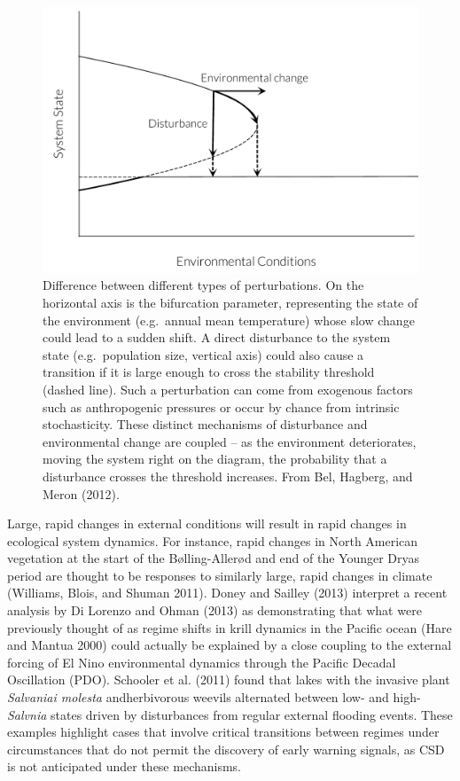 \documentclass[author-year, review]{elsarticle} %
\makeatletter
\def\maxwidth{\ifdim\Gin@nat@width>\linewidth\linewidth
\else\Gin@nat@width\fi}
\let\Oldincludegraphics\includegraphics
\renewcommand{\includegraphics}[1]{\Oldincludegraphics[width=\maxwidth]{#1}}
\makeatother
\begin{document}
\begin{figure}[htbp]
\centering
\includegraphics{Bel2012example.pdf}
\caption{Difference between different types of perturbations. On the
horizontal axis is the bifurcation parameter, representing the state of
the environment (e.g.~annual mean temperature) whose slow change could
lead to a sudden shift. A direct disturbance to the system state
(e.g.~population size, vertical axis) could also cause a transition if
it is large enough to cross the stability threshold (dashed line). Such
a perturbation can come from exogenous factors such as anthropogenic
pressures or occur by chance from intrinsic stochasticity. These
distinct mechanisms of disturbance and environmental change are coupled
-- as the environment deteriorates, moving the system right on the
diagram, the probability that a disturbance crosses the threshold
increases. From Bel, Hagberg, and Meron (2012).}
\end{figure}

Large, rapid changes in external conditions will result in rapid changes
in ecological system dynamics. For instance, rapid changes in North
American vegetation at the start of the Bølling-Allerød and end of the
Younger Dryas period are thought to be responses to similarly large,
rapid changes in climate (Williams, Blois, and Shuman 2011). Doney and
Sailley (2013) interpret a recent analysis by Di Lorenzo and Ohman
(2013) as demonstrating that what were previously thought of as regime
shifts in krill dynamics in the Pacific ocean (Hare and Mantua 2000)
could actually be explained by a close coupling to the external forcing
of El Nino environmental dynamics through the Pacific Decadal
Oscillation (PDO). Schooler et al. (2011) found that lakes with the
invasive plant \emph{Salvaniai molesta} andherbivorous weevils
alternated between low- and high-\emph{Salvnia} states driven by
disturbances from regular external flooding events. These examples
highlight cases that involve critical transitions between regimes under
circumstances that do not permit the discovery of early warning signals,
as CSD is not anticipated under these mechanisms.
\end{document}
